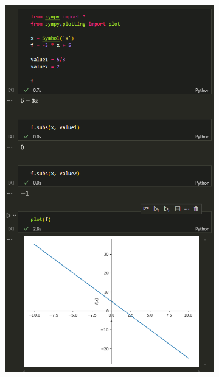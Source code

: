 \documentclass[14pt,a4paper]{extarticle}
\begin{document}
\begin{figure}[h!]
    \centering
    \begin{subfigure}{.5\textwidth}
        \centering
        \includegraphics[width=0.9\linewidth]{figures/inftech/lab1/1.1 (1).png}
        \label{fig:1.1(1)}
    \end{subfigure}%
    \begin{subfigure}{.5\textwidth}
        \centering

\end{subfigure}
\end{figure}
\end{document}
